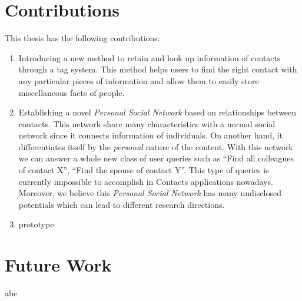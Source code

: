 \section{Contributions}
This thesis has the following contributions:

\begin{enumerate}
    \item Introducing a new method to retain and look up information of contacts through a tag system. This method helps users to find the right contact with any particular pieces of information and allow them to easily store miscellaneous facts of people.
    \item Establishing a novel \textit{Personal Social Network} based on relationships between contacts. This network share many characteristics with a normal social network since it connects information of individuals. On another hand, it differentiates itself by the \textit{personal} nature of the content. With this network we can answer a whole new class of user queries such as ``Find all colleagues of contact X'', ``Find the spouse of contact Y''. This type of queries is currently impossible to accomplish in Contacts applications nowadays. Moreover, we believe this \textit{Personal Social Network} has many undisclosed potentials which can lead to different research directions.
    \item prototype
\end{enumerate}

\section{Future Work}
abc


